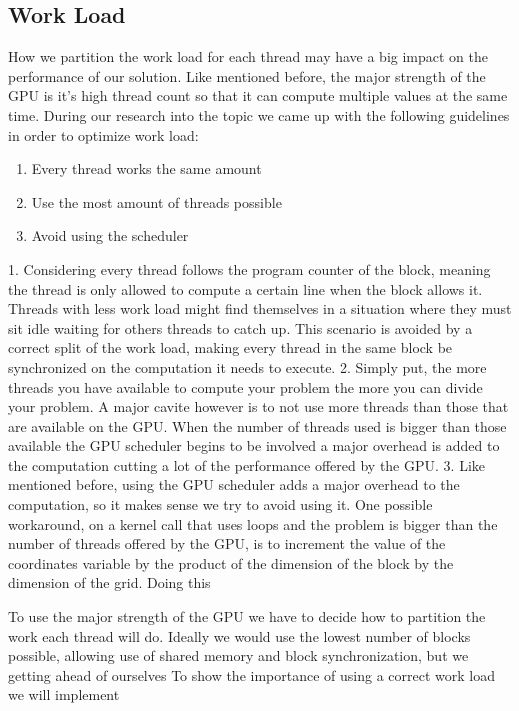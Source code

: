 \documentclass[runningheads]{llncs}
\begin{document}
\subsection{Work Load}

How we partition the work load for each thread may have a big impact on the performance of our solution. Like mentioned before, the major strength of the GPU is it's high thread count so that it can compute multiple values at the same time.
During our research into the topic we came up with the following guidelines in order to optimize work load: %
\begin{enumerate}
	\item Every thread works the same amount
	\item Use the most amount of threads possible
	\item Avoid using the scheduler
	\newline
\end{enumerate}
1. Considering every thread follows the program counter of the block, meaning the thread is only allowed to compute a certain line when the block allows it.
Threads with less work load might find themselves in a situation where they must sit idle waiting for others threads to catch up.
This scenario is avoided by a correct split of the work load, making every thread in the same block be synchronized on the computation it needs to execute.
\newline
\newline
2. Simply put, the more threads you have available to compute your problem the more you can divide your problem. A major cavite however is to not use more threads than those that are available on the GPU. When the number of threads used is bigger than those available the GPU scheduler begins to be involved a major overhead is added to the computation cutting a lot of the performance offered by the GPU.
\newline
\newline
3. Like mentioned before, using the GPU scheduler adds a major overhead to the computation, so it makes sense we try to avoid using it.
One possible workaround, on a kernel call that uses loops and the problem is bigger than the number of threads offered by the GPU, is to increment the value of the coordinates variable by the product of the dimension of the block by the dimension of the grid. Doing this

To use the major strength of the GPU we have to decide how to partition the work each thread will do. 
Ideally we would use the lowest number of blocks possible, allowing use of shared memory and block synchronization, but we getting ahead of ourselves %
To show the importance of using a correct work load we will implement
\end{document}
